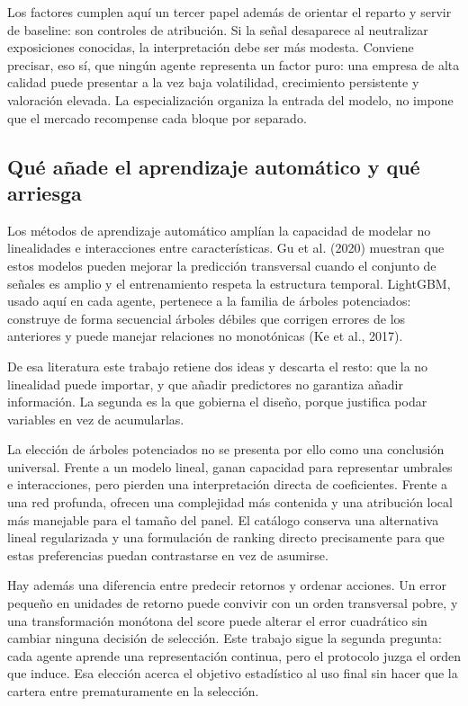 Los factores cumplen aquí un tercer papel además de orientar el reparto y servir de baseline: son
controles de atribución. Si la señal desaparece al neutralizar exposiciones conocidas, la
interpretación debe ser más modesta. Conviene precisar, eso sí, que ningún agente representa un
factor puro: una empresa de alta calidad puede presentar a la vez baja volatilidad, crecimiento
persistente y valoración elevada. La especialización organiza la entrada del modelo, no impone que
el mercado recompense cada bloque por separado.

\subsection{Qué añade el aprendizaje automático y qué arriesga}

Los métodos de aprendizaje automático amplían la capacidad de modelar no linealidades e
interacciones entre características. Gu et al. (2020) muestran que estos modelos pueden
mejorar la predicción transversal cuando el conjunto de señales es amplio y el entrenamiento respeta
la estructura temporal. LightGBM, usado aquí en cada agente, pertenece a la familia de árboles
potenciados: construye de forma secuencial árboles débiles que corrigen errores de los anteriores y
puede manejar relaciones no monotónicas (Ke et al., 2017).

De esa literatura este trabajo retiene dos ideas y descarta el resto: que la no linealidad puede
importar, y que añadir predictores no garantiza añadir información. La segunda es la que gobierna el
diseño, porque justifica podar variables en vez de acumularlas.

La elección de árboles potenciados no se presenta por ello como una conclusión universal. Frente a
un modelo lineal, ganan capacidad para representar umbrales e interacciones, pero pierden una
interpretación directa de coeficientes. Frente a una red profunda, ofrecen una complejidad más
contenida y una atribución local más manejable para el tamaño del panel. El catálogo conserva una
alternativa lineal regularizada y una formulación de ranking directo precisamente para que estas
preferencias puedan contrastarse en vez de asumirse.

Hay además una diferencia entre predecir retornos y ordenar acciones. Un error pequeño en unidades
de retorno puede convivir con un orden transversal pobre, y una transformación monótona del score
puede alterar el error cuadrático sin cambiar ninguna decisión de selección. Este trabajo sigue la
segunda pregunta: cada agente aprende una representación continua, pero el protocolo juzga el orden
que induce. Esa elección acerca el objetivo estadístico al uso final sin hacer que la cartera entre
prematuramente en la selección.

